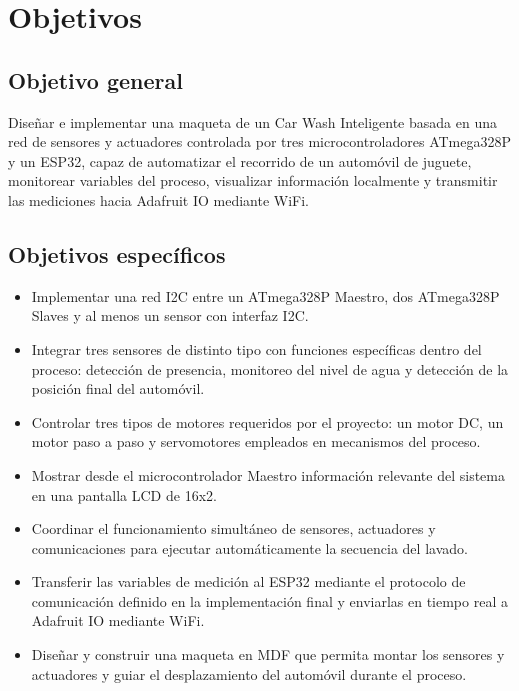 \section{Objetivos}

\subsection{Objetivo general}
Diseñar e implementar una maqueta de un Car Wash Inteligente basada en una red de sensores y actuadores controlada por tres microcontroladores ATmega328P y un ESP32, capaz de automatizar el recorrido de un automóvil de juguete, monitorear variables del proceso, visualizar información localmente y transmitir las mediciones hacia Adafruit IO mediante WiFi.

\subsection{Objetivos específicos}
\begin{itemize}[leftmargin=*]
    \item Implementar una red I2C entre un ATmega328P Maestro, dos ATmega328P Slaves y al menos un sensor con interfaz I2C.
    \item Integrar tres sensores de distinto tipo con funciones específicas dentro del proceso: detección de presencia, monitoreo del nivel de agua y detección de la posición final del automóvil.
    \item Controlar tres tipos de motores requeridos por el proyecto: un motor DC, un motor paso a paso y servomotores empleados en mecanismos del proceso.
    \item Mostrar desde el microcontrolador Maestro información relevante del sistema en una pantalla LCD de 16x2.
    \item Coordinar el funcionamiento simultáneo de sensores, actuadores y comunicaciones para ejecutar automáticamente la secuencia del lavado.
    \item Transferir las variables de medición al ESP32 mediante el protocolo de comunicación definido en la implementación final y enviarlas en tiempo real a Adafruit IO mediante WiFi.
    \item Diseñar y construir una maqueta en MDF que permita montar los sensores y actuadores y guiar el desplazamiento del automóvil durante el proceso.
\end{itemize}
